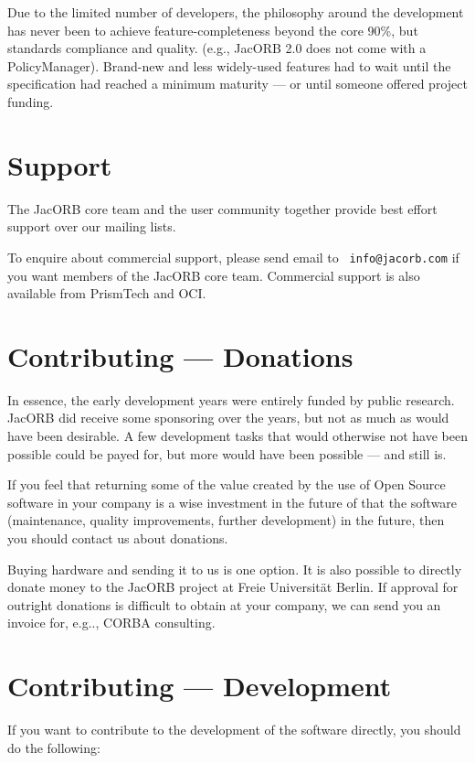 Due to the limited number of developers, the philosophy around the
development has never been to achieve feature-completeness beyond the
core 90\%, but standards compliance and quality.  (e.g., JacORB 2.0
does not come with a PolicyManager).  Brand-new and less widely-used
features had to wait until the specification had reached a minimum
maturity --- or until someone offered project funding.

\section{Support}

The JacORB core team and the user community together provide best
effort support over our mailing lists.

To enquire about commercial support, please send email to {\tt
  info@jacorb.com} if you want members of the JacORB core team.
Commercial support is also available from PrismTech and OCI.

\section{Contributing --- Donations}

In essence, the early development years were entirely funded by public
research. JacORB did receive some sponsoring over the years, but not
as much as would have been desirable. A few development tasks that
would otherwise not have been possible could be payed for, but more
would have been possible --- and still is.

If you feel that returning some of the value created by the use of
Open Source software in your company is a wise investment in the
future of that the software (maintenance, quality improvements,
further development) in the future, then you should contact us about
donations.

Buying hardware and sending it to us is one option. It is also
possible to directly donate money to the JacORB project at Freie
Universit{\"a}t Berlin. If approval for outright donations is
difficult to obtain at your company, we can send you an invoice for,
e.g.., CORBA consulting.

\section{Contributing --- Development}

If you want to contribute to the development of the software directly,
you should do the following:

